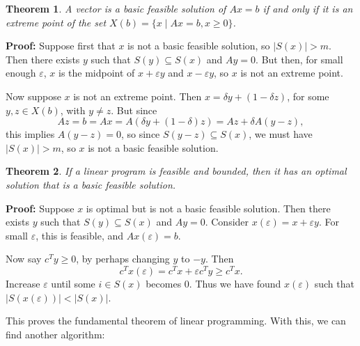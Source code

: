 \documentclass[12pt]{article}
\newtheorem{theorem}{Theorem}[section]
\theoremstyle{definition}
\theoremstyle{remark}
\begin{document}
\begin{theorem}
	A vector is a basic feasible solution of $Ax = b$ if and only if it is an extreme point of the set $X(b) = \{x \mid Ax = b, x \geq 0\}$.
\end{theorem}

\begin{adjustbox}{minipage = \columnwidth - 25.5pt, margin=1em, frame=1pt, margin=0em}
	\textbf{Proof:} Suppose first that $x$ is not a basic feasible solution, so $|S(x)| > m$. Then there exists $y$ such that $S(y) \subseteq S(x)$ and $Ay = 0$. But then, for small enough $\varepsilon$, $x$ is the midpoint of $x + \varepsilon y$ and $x - \varepsilon y$, so $x$ is not an extreme point.

\end{adjustbox}

\begin{adjustbox}{minipage = \columnwidth - 25.5pt, margin=1em, frame=1pt, margin=0em}
	Now suppose $x$ is not an extreme point. Then $x = \delta y + (1 - \delta z)$, for some $y, z \in X(b)$, with $y \neq z$. But since
	\[
		Az = b = Ax = A(\delta y + (1 - \delta) z) = Az + \delta A(y - z)
	,\]
	this implies $A(y - z) = 0$, so since $S(y - z) \subseteq S(x)$, we must have $|S(x)| > m$, so $x$ is not a basic feasible solution.
\end{adjustbox}

\begin{theorem}
	If a linear program is feasible and bounded, then it has an optimal solution that is a basic feasible solution.
\end{theorem}

\begin{adjustbox}{minipage = \columnwidth - 25.5pt, margin=1em, frame=1pt, margin=0em}
	\textbf{Proof:} Suppose $x$ is optimal but is not a basic feasible solution. Then there exists $y$ such that $S(y) \subseteq S(x)$ and $Ay = 0$. Consider $x(\varepsilon) = x + \varepsilon y$. For small $\varepsilon$, this is feasible, and $Ax(\varepsilon) = b$.

	Now say $c^{T}y \geq 0$, by perhaps changing $y$ to $-y$. Then
	\[
		c^{T}x(\varepsilon) = c^{T}x + \varepsilon c^{T}y \geq c^{T}x
	.\]
	Increase $\varepsilon$ until some $i \in S(x)$ becomes $0$. Thus we have found $x(\varepsilon)$ such that $|S(x(\varepsilon))| < |S(x)|$.
\end{adjustbox}

This proves the fundamental theorem of linear programming. With this, we can find another algorithm:
\end{document}
